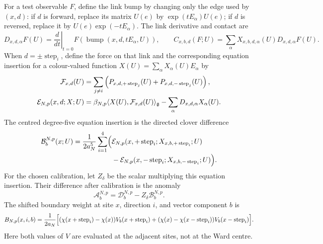 For a test observable $F$, define the link bump by changing only the edge used by $(x,d)$: if $d$ is forward, replace its matrix $U(e)$ by $\exp(tE_\alpha)U(e)$; if $d$ is reversed, replace it by $U(e)\exp(-tE_\alpha)$. The link derivative and contact are
\begin{equation*}
 D_{x,d,\alpha}F(U)=\left.\frac{d}{dt}\right|_{t=0}F(\operatorname{bump}(x,d,tE_\alpha,U)),\qquad
 C_{x,b,d}(F;U)=\sum_\alpha X_{x,b,d,\alpha}(U)D_{x,d,\alpha}F(U).
\end{equation*}
When $d=\pm\operatorname{step}_i$, define the force on that link and the corresponding equation insertion for a colour-valued function $X(U)=\sum_\alpha X_\alpha(U)E_\alpha$ by
\begin{equation*}
\begin{aligned}
 \mathcal F_{x,d}(U)&=\sum_{j\ne i}\left(P_{x,d,+\operatorname{step}_j}(U)+P_{x,d,-\operatorname{step}_j}(U)\right),\\
 \mathcal E_{N,p}(x,d;X;U)&=\beta_{N,p}\langle X(U),\mathcal F_{x,d}(U)\rangle_{\mathfrak g}
 -\sum_\alpha D_{x,d,\alpha}X_\alpha(U).
\end{aligned}
\end{equation*}
The centred degree-five equation insertion is the directed clover difference
\begin{equation*}
\begin{aligned}
 \mathcal B_b^{N,p}(x;U)=\frac{1}{2a_N^5}\sum_{i=1}^4\Bigl(&
 \mathcal E_{N,p}(x,+\operatorname{step}_i;X_{x,b,+\operatorname{step}_i};U)\\[-2pt]
 &-\mathcal E_{N,p}(x,-\operatorname{step}_i;X_{x,b,-\operatorname{step}_i};U)\Bigr).
\end{aligned}
\end{equation*}
For the chosen calibration, let $Z_\delta$ be the scalar multiplying this equation insertion. Their difference after calibration is the anomaly
\begin{equation}\label{eq:ward-anomaly}
 \mathcal A_b^{N,p}=\mathcal D_b^{N,p}-Z_\delta\mathcal B_b^{N,p}.
\end{equation}
The shifted boundary weight at site $x$, direction $i$, and vector component $b$ is
\begin{equation*}
 B_{N,p}(x,i,b)=\frac{1}{2a_N}\Bigl[(\chi(x+\operatorname{step}_i)-\chi(x))V_b(x+\operatorname{step}_i)
 +(\chi(x)-\chi(x-\operatorname{step}_i))V_b(x-\operatorname{step}_i)\Bigr].
\end{equation*}
Here both values of $V$ are evaluated at the adjacent sites, not at the Ward centre.

